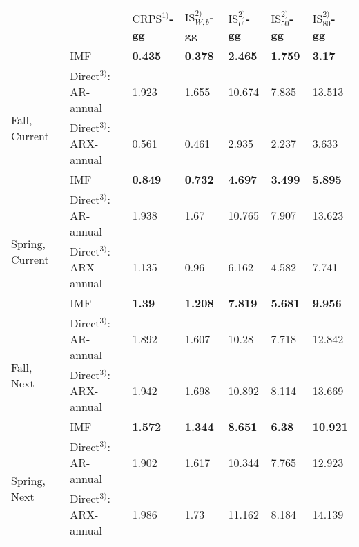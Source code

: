 \begin{table}[!h]
\centering
\begin{tabular}{lllllll}
\toprule
 &  & $\text{CRPS}^{1)}$-gg & $\text{IS}_{W,b}^{2)}$-gg & $\text{IS}_{U}^{2)}$-gg & $\text{IS}_{50}^{2)}$-gg & $\text{IS}_{80}^{2)}$-gg\\
\midrule
 & IMF & \textbf{0.435} & \textbf{0.378} & \textbf{2.465} & \textbf{1.759} & \textbf{3.17}\\
\multirow{3}{*}{Fall, Current}
 & Direct$^{3)}$: AR-annual & 1.923 & 1.655 & 10.674 & 7.835 & 13.513\\
 & Direct$^{3)}$: ARX-annual & 0.561 & 0.461 & 2.935 & 2.237 & 3.633\\
\addlinespace
 & IMF & \textbf{0.849} & \textbf{0.732} & \textbf{4.697} & \textbf{3.499} & \textbf{5.895}\\
\multirow{3}{*}{Spring, Current}
 & Direct$^{3)}$: AR-annual & 1.938 & 1.67 & 10.765 & 7.907 & 13.623\\
 & Direct$^{3)}$: ARX-annual & 1.135 & 0.96 & 6.162 & 4.582 & 7.741\\
\addlinespace
 & IMF & \textbf{1.39} & \textbf{1.208} & \textbf{7.819} & \textbf{5.681} & \textbf{9.956}\\
\multirow{3}{*}{Fall, Next}
 & Direct$^{3)}$: AR-annual & 1.892 & 1.607 & 10.28 & 7.718 & 12.842\\
 & Direct$^{3)}$: ARX-annual & 1.942 & 1.698 & 10.892 & 8.114 & 13.669\\
\addlinespace
 & IMF & \textbf{1.572} & \textbf{1.344} & \textbf{8.651} & \textbf{6.38} & \textbf{10.921}\\
\multirow{3}{*}{Spring, Next}
 & Direct$^{3)}$: AR-annual & 1.902 & 1.617 & 10.344 & 7.765 & 12.923\\
 & Direct$^{3)}$: ARX-annual & 1.986 & 1.73 & 11.162 & 8.184 & 14.139\\
\bottomrule
\end{tabular}
\end{table}
